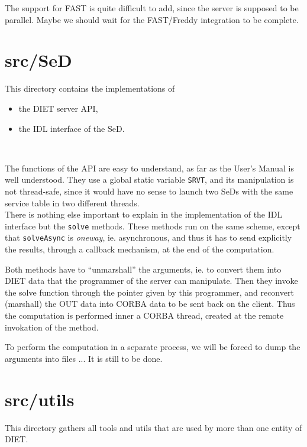 The support for FAST is quite difficult to add, since the server is supposed to
be parallel. Maybe we should wait for the FAST/Freddy integration to be
complete.



\section{\textsf{src/SeD}}
\label{s:SeD}

This directory contains the implementations of
\begin{itemize}
\item the DIET server API,
\item the IDL interface of the SeD.
\end{itemize}
\

The functions of the API are easy to understand, as far as the User's Manual is
well understood. They use a global static variable \texttt{SRVT}, and its
manipulation is not thread-safe, since it would have no sense to launch two SeDs
with the same service table in two different threads.
\\

There is nothing else important to explain in the implementation of the IDL
interface but the \texttt{solve} methods. These methods run on the same
scheme, except that \texttt{solveAsync} is \textit{oneway}, ie. asynchronous,
and thus it has to send explicitly the results, through a callback mechanism, at
the end of the computation.


Both methods have to ``unmarshall'' the arguments, ie. to convert them into DIET
data that the programmer of the server can manipulate. Then they invoke the
solve function through the pointer given by this programmer, and reconvert
(marshall) the OUT data into CORBA data to be sent back on the client. Thus the
computation is performed inner a CORBA thread, created at the remote invokation
of the method.

To perform the computation in a separate process, we will be forced to dump the
arguments into files ... It is still to be done.


\section{\textsf{src/utils}}
\label{s:utils}

This directory gathers all tools and utils that are used by more than one
entity of DIET.


